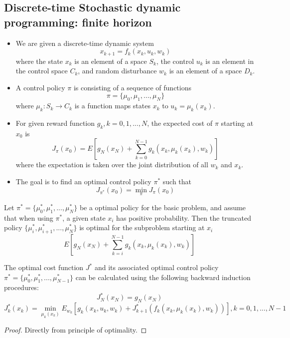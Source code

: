 \begin{refsection}
\subsection{Discrete-time Stochastic dynamic programming: finite horizon }
\begin{definition}\cite[12]{bertsekas2012dynamic}\hfill
	\begin{itemize}
		\item We are given a discrete-time dynamic system
		$$x_{k+1}  =  f_k(x_k,u_k,w_k)$$
		where the state $x_k$ is an element of a space $S_k$, the control $u_k$ is an element in the control space $C_k$, and random disturbance $w_k$ is an element of a space $D_k$.
		\item A control policy $\pi$ is consisting of a sequence of functions
		$$\pi = \{\mu_0,\mu_1,...,\mu_N\}$$
		where $\mu_k:S_k\to C_k$ is a function  maps states $x_k$ to $u_k = \mu_k(x_k)$.
		\item For given reward function $g_k,k=0,1,...,N$, the expected cost of $\pi$ starting at $x_0$ is
		$$J_\pi(x_0) = E[g_N(x_N) + \sum_{k=0}^{N-1} g_k(x_k,\mu_k(x_k),w_k)]$$
		where the expectation is taken over the joint distribution of all $w_k$ and $x_k$.
		\item The goal is to find an optimal control policy $\pi^*$ such that 
		$$J_{\pi^*}(x_0) = \min_{\pi} J_\pi(x_0)$$
	\end{itemize}
\end{definition}


\begin{theorem}
	\cite[18]{bertsekas2012dynamic}
	Let $\pi^* = \{\mu_0^*,\mu_1^*,...,\mu_N^*\}$ be a optimal policy for the basic problem, and assume that when using $\pi^*$, a given state $x_i$ has positive probability. Then the truncated policy $\{\mu_i^*,\mu_{i+1}^*,...,\mu_N^*\}$ is optimal for the subproblem starting at $x_i$
	$$E[g_N(x_N) + \sum_{k=i}^{N-1} g_k(x_k,\mu_k(x_k),w_k)]$$
\end{theorem}

\begin{lemma}
	The optimal cost function $J^*$ and its associated optimal control policy $\pi^* = \{\mu_0^*,\mu_1^*,...,\mu_{N-1}^*\}$ can be calculated using the following backward induction procedures:
	$$J^*_N(x_N) = g_N(x_N)$$
	$$J^*_k(x_k) = \min_{\mu_k(x_k)} E_{w_k}[g_k(x_k,u_k,w_k) + J^*_{k+1}(f_k(x_k,\mu_k(x_k),w_k))],k=0,1,...,N-1$$
\end{lemma}
\begin{proof}
	Directly from principle of optimality.	
\end{proof}



\end{refsection}
